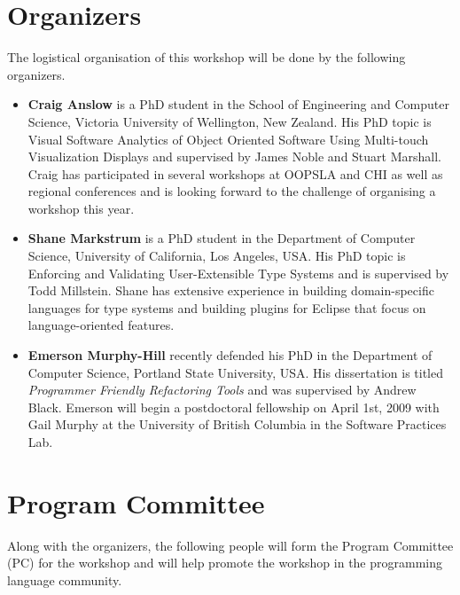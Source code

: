 \documentclass{acm_proc_article-sp}
\begin{document}
\section{Organizers}

The logistical organisation of this workshop will be done by the following organizers.

\begin{itemize}
\item \textbf{Craig Anslow} is a PhD student in the School of
Engineering and Computer Science, Victoria University of Wellington,
New Zealand. His PhD topic is Visual Software Analytics of Object
Oriented Software Using Multi-touch Visualization Displays and
supervised by James Noble and Stuart Marshall. Craig has participated
in several workshops at OOPSLA and CHI as well as regional conferences
and is looking forward to the challenge of organising a workshop this
year.

\item \textbf{Shane Markstrum} is a PhD student in the Department of
Computer Science, University of California, Los Angeles, USA. His PhD
topic is Enforcing and Validating User-Extensible Type Systems and is
supervised by Todd Millstein. Shane has extensive experience in
building domain-specific languages for type systems and building
plugins for Eclipse that focus on language-oriented features.

\item \textbf{Emerson Murphy-Hill} recently defended his PhD in the
Department of Computer Science, Portland State University, USA. His
dissertation is titled \emph{Programmer Friendly Refactoring Tools} and was supervised by
Andrew Black. Emerson will begin a postdoctoral fellowship on April 1st, 2009 with Gail Murphy at
the University of British Columbia in the Software Practices Lab.
\end{itemize}

\section{Program Committee}

Along with the organizers, the following people will form the Program Committee (PC) for
the workshop and will help promote the workshop in the programming
language community.
\end{document}
